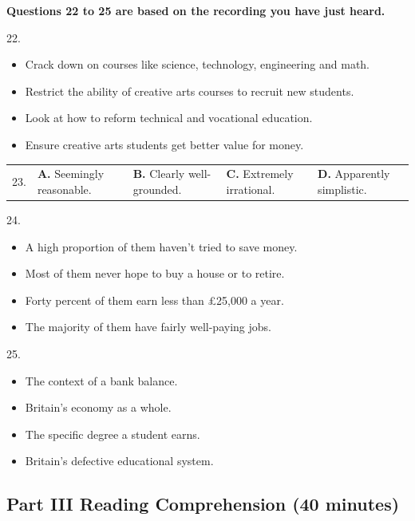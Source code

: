\documentclass[UTF8,11pt]{ctexart}
\begin{document}
\textbf{Questions 22 to 25 are based on the recording you have just heard.}


22.


\begin{itemize}[leftmargin=2em,itemsep=.2em,topsep=.4em]\item[A.] Crack down on courses like science, technology, engineering and math.
\item[B.] Restrict the ability of creative arts courses to recruit new students.
\item[C.] Look at how to reform technical and vocational education.
\item[D.] Ensure creative arts students get better value for money.
\end{itemize}

\noindent\begin{tabularx}{\linewidth}{@{}lXXXX@{}}23. & \textbf{A.} Seemingly reasonable. & \textbf{B.} Clearly well-grounded. & \textbf{C.} Extremely irrational. & \textbf{D.} Apparently simplistic.\\\end{tabularx}\par

24.


\begin{itemize}[leftmargin=2em,itemsep=.2em,topsep=.4em]\item[A.] A high proportion of them haven’t tried to save money.
\item[B.] Most of them never hope to buy a house or to retire.
\item[C.] Forty percent of them earn less than £25,000 a year.
\item[D.] The majority of them have fairly well-paying jobs.
\end{itemize}

25.


\begin{itemize}[leftmargin=2em,itemsep=.2em,topsep=.4em]\item[A.] The context of a bank balance.
\item[B.] Britain’s economy as a whole.
\item[C.] The specific degree a student earns.
\item[D.] Britain’s defective educational system.
\end{itemize}

\subsection*{\textbf{Part III Reading Comprehension (40 minutes)}}
\end{document}
